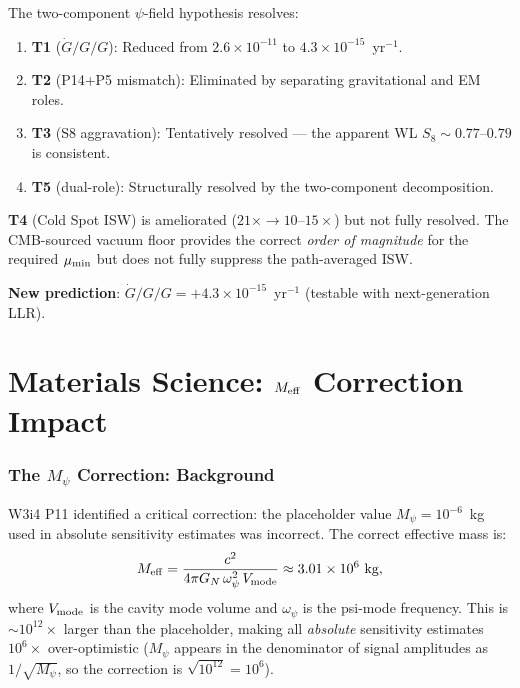 \documentclass[11pt]{article}
\newcommand{\ee}[1]{\times 10^{#1}}
\newcommand{\GN}{G_N}
\newcommand{\Gdot}{\dot{G}/G}
\newcommand{\mumin}{\mu_{\rm min}}
\newcommand{\Meff}{M_{\rm eff}}
\newcommand{\Mpsi}{M_\psi}
\begin{document}
\begin{tcolorbox}[colback=green!5!white, colframe=green!60!black,
  title=\textbf{W3i5 Cosmology Scorecard: 4 of 5 Tensions Resolved}]
The two-component $\psi$-field hypothesis resolves:
\begin{enumerate}[nosep]
  \item \textbf{T1} ($\Gdot/G$): Reduced from $2.6\ee{-11}$ to $4.3\ee{-15}$~yr$^{-1}$.
  \item \textbf{T2} (P14+P5 mismatch): Eliminated by separating gravitational
    and EM roles.
  \item \textbf{T3} (S8 aggravation): Tentatively resolved --- the apparent
    WL $S_8 \sim 0.77$--$0.79$ is consistent.
  \item \textbf{T5} (dual-role): Structurally resolved by the two-component
    decomposition.
\end{enumerate}
\textbf{T4} (Cold Spot ISW) is ameliorated ($21\times \to 10$--$15\times$)
but not fully resolved. The CMB-sourced vacuum floor provides the correct
\emph{order of magnitude} for the required $\mumin$ but does not fully
suppress the path-averaged ISW.

\textbf{New prediction}: $\Gdot/G = +4.3\ee{-15}$~yr$^{-1}$ (testable
with next-generation LLR).
\end{tcolorbox}

\part{Materials Science: $M_{\rm eff}$ Correction Impact}

\section{The $M_\psi$ Correction: Background}
\label{sec:Mpsi-background}

W3i4 P11 identified a critical correction: the placeholder value
$\Mpsi = 10^{-6}$~kg used in absolute sensitivity estimates was
incorrect. The correct effective mass is:
\begin{equation}
  \Meff = \frac{c^2}{4\pi \GN\,\omega_\psi^2\,V_{\rm mode}}
  \approx 3.01\ee{6}~\text{kg},
\end{equation}
where $V_{\rm mode}$ is the cavity mode volume and $\omega_\psi$ is
the psi-mode frequency. This is $\sim 10^{12}\times$ larger than the
placeholder, making all \emph{absolute} sensitivity estimates
$10^6\times$ over-optimistic ($\Mpsi$ appears in the denominator of
signal amplitudes as $1/\sqrt{\Mpsi}$, so the correction is
$\sqrt{10^{12}} = 10^6$).
\end{document}
